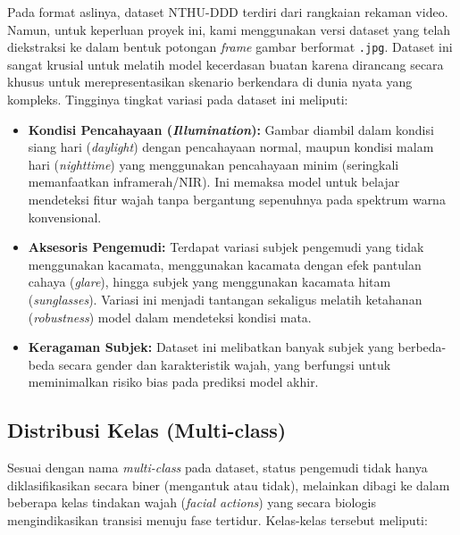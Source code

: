 \documentclass[11pt,a4paper,oneside]{report}
\begin{document}
Pada format aslinya, dataset NTHU-DDD terdiri dari rangkaian rekaman video. Namun, untuk keperluan proyek ini, kami menggunakan versi dataset yang telah diekstraksi ke dalam bentuk potongan \textit{frame} gambar berformat \texttt{.jpg}. Dataset ini sangat krusial untuk melatih model kecerdasan buatan karena dirancang secara khusus untuk merepresentasikan skenario berkendara di dunia nyata yang kompleks. Tingginya tingkat variasi pada dataset ini meliputi:

\begin{itemize}
    \item \textbf{Kondisi Pencahayaan (\textit{Illumination}):} Gambar diambil dalam kondisi siang hari (\textit{daylight}) dengan pencahayaan normal, maupun kondisi malam hari (\textit{nighttime}) yang menggunakan pencahayaan minim (seringkali memanfaatkan inframerah/NIR). Ini memaksa model untuk belajar mendeteksi fitur wajah tanpa bergantung sepenuhnya pada spektrum warna konvensional.
    \item \textbf{Aksesoris Pengemudi:} Terdapat variasi subjek pengemudi yang tidak menggunakan kacamata, menggunakan kacamata dengan efek pantulan cahaya (\textit{glare}), hingga subjek yang menggunakan kacamata hitam (\textit{sunglasses}). Variasi ini menjadi tantangan sekaligus melatih ketahanan (\textit{robustness}) model dalam mendeteksi kondisi mata.
    \item \textbf{Keragaman Subjek:} Dataset ini melibatkan banyak subjek yang berbeda-beda secara gender dan karakteristik wajah, yang berfungsi untuk meminimalkan risiko bias pada prediksi model akhir.
\end{itemize}

\subsection{Distribusi Kelas (Multi-class)}

Sesuai dengan nama \textit{multi-class} pada dataset, status pengemudi tidak hanya diklasifikasikan secara biner (mengantuk atau tidak), melainkan dibagi ke dalam beberapa kelas tindakan wajah (\textit{facial actions}) yang secara biologis mengindikasikan transisi menuju fase tertidur. Kelas-kelas tersebut meliputi:
\end{document}
